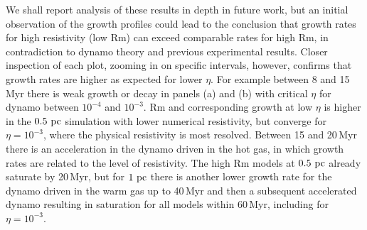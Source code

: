\documentclass[preprint2]{aastex63}
\newcommand\pc{~ {\rm pc}}
\begin{document}
We shall report analysis of these results in depth in future work, but an 
initial observation of the growth profiles could lead to the conclusion that
growth rates for high resistivity (low Rm) can exceed comparable rates for high
Rm, in contradiction to dynamo theory and previous experimental results.
Closer inspection of each plot, zooming in on specific intervals, however,
confirms that growth rates are higher as expected for lower $\eta$.
For example between 8 and 15 Myr there is weak growth or decay in panels (a)
and (b) with critical $\eta$ for dynamo between $10^{-4}$ and $10^{-3}$.
Rm and corresponding growth at low $\eta$ is higher in the $0.5\pc$ simulation
with lower numerical resistivity, but 
converge for $\eta=10^{-3}$, where the physical resistivity is most resolved.
Between 15 and 20\,Myr there is an acceleration in the dynamo driven in the hot
gas, in which growth rates are related to the level of resistivity.
The high Rm models at $0.5\pc$ already saturate by 20\,Myr, but for $1\pc$ there
is another lower growth rate for the dynamo driven in the warm gas up to
40\,Myr and then a subsequent accelerated dynamo resulting in saturation for
all models within 60\,Myr, including for $\eta=10^{-3}$.
\end{document}
